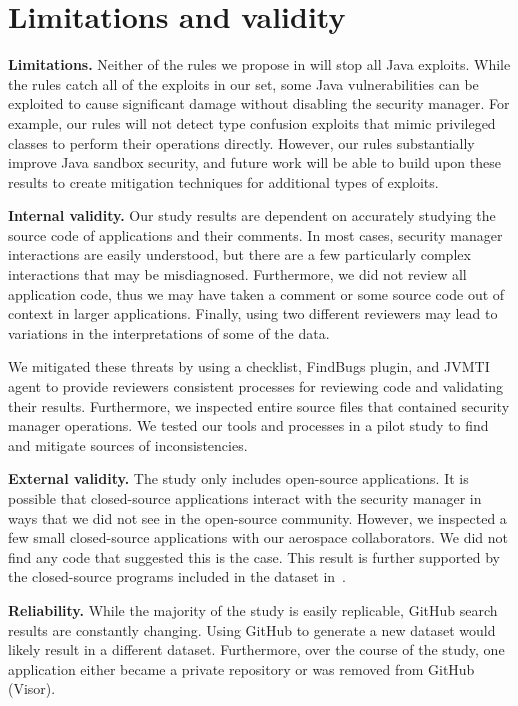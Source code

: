\documentclass{sig-alternate}
\newcommand{\minisec}[1]{\noindent\textbf{#1}}
\begin{document}
\section{Limitations and validity}\label{sec:Limitations}

\minisec{Limitations.}
Neither of the rules we propose in  will stop all Java exploits. While the rules
catch all of the exploits in our set, some Java vulnerabilities can
be exploited to cause significant damage without disabling the security
manager. For example, our rules will not detect type confusion exploits
that mimic privileged classes to perform their operations directly.
However, our rules substantially improve Java sandbox security, and
future work will be able to build upon these results to create mitigation
techniques for additional types of exploits.

\minisec{Internal validity.} 
Our study results are dependent on accurately studying the source code of
applications and their comments. In most cases, security manager interactions
are easily understood, but there are a few particularly complex interactions
that may be misdiagnosed. Furthermore, we did not review all application
code, thus we may have taken a comment or some source code out of
context in larger applications. Finally, using two different reviewers
may lead to variations in the interpretations of some of the data. 

We mitigated these threats by using a checklist, FindBugs plugin, and JVMTI agent to
provide reviewers consistent processes for reviewing code
and validating their results. Furthermore,
we inspected entire source files that contained
security manager operations. We tested our tools and processes in a pilot study
to find and mitigate sources of inconsistencies.

\minisec{External validity.}
The study only includes open-source applications. It is possible
that closed-source applications interact with the security manager
in ways that we did not see in the open-source community. However,
we inspected a few small closed-source applications with our aerospace collaborators.
We did not find any code that suggested this is the case.  This result is
further supported by the closed-source programs included in the dataset
in~. 

\minisec{Reliability.}
While the majority of the study is easily replicable, GitHub search results are constantly
changing. Using GitHub to generate a new dataset
would likely result in a different dataset. Furthermore, over the course of the
study, one application either became a private repository
or was removed from GitHub (Visor).
\end{document}
